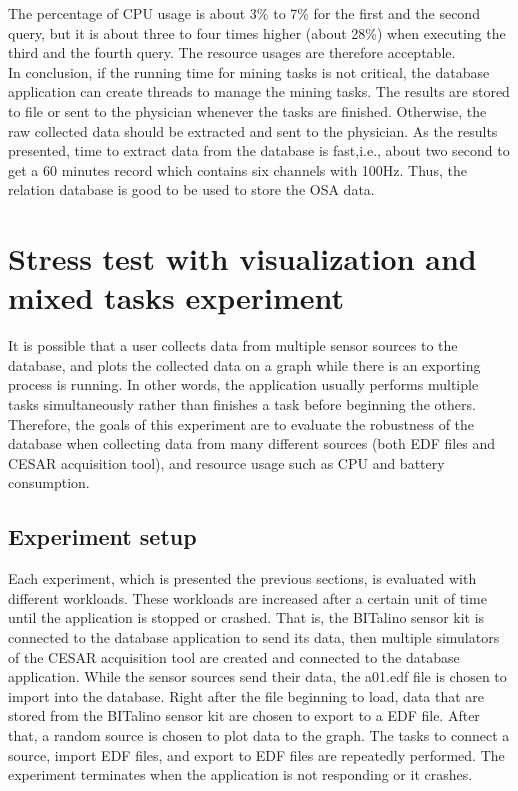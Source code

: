 The percentage of CPU usage is about 3\% to 7\% for the first and the second query, but it is about three to four times higher (about 28\%) when executing the third and the fourth query. The resource usages are therefore acceptable.\\
In conclusion, if the running time for mining tasks is not critical, the database application can create threads to manage the mining tasks. The results are stored to file or sent to the physician whenever the tasks are finished. Otherwise, the raw collected data should be extracted and sent to the physician. As the results presented, time to extract data from the database is fast,i.e., about two second to get a 60 minutes record which contains six channels with 100Hz. Thus, the relation database is good to be used to store the OSA data.
\section{Stress test with visualization and mixed tasks experiment}
It is possible that a user collects data from multiple sensor sources to the database, and plots the collected data on a graph while there is an exporting process is running. In other words, the application usually performs multiple tasks simultaneously rather than finishes a task before beginning the others.\\
Therefore, the goals of this experiment are to evaluate the robustness of the database when collecting data from many different sources (both EDF files and CESAR acquisition tool), and resource usage such as CPU and battery consumption.
\subsection{Experiment setup}
Each experiment, which is presented the previous sections, is evaluated with different workloads. These workloads are increased after a certain unit of time until the application is stopped or crashed. That is, the BITalino sensor kit is connected to the database application to send its data, then multiple simulators of the CESAR acquisition tool are created and connected to the database application. While the sensor sources send their data, the a01.edf file is chosen to import into the database. Right after the file beginning to load, data that are stored from the BITalino sensor kit are chosen to export to a EDF file. After that, a random source is chosen to plot data to the graph. The tasks to connect a source, import EDF files, and export to EDF files are repeatedly performed. The experiment terminates when the application is not responding or it crashes.
